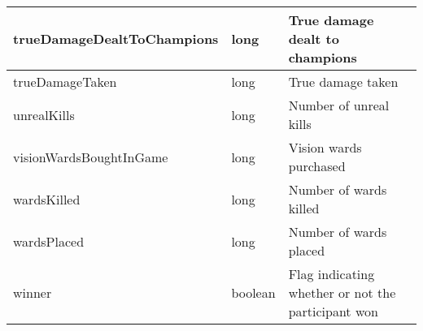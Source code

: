 \begin{table}[!h]
\begin{tabular}{llp{5cm}}
trueDamageDealtToChampions      & long               & True damage dealt to champions                                                  \\ \hline
trueDamageTaken                 & long               & True damage taken                                                               \\ \hline
unrealKills                     & long               & Number of unreal kills                                                          \\ \hline
visionWardsBoughtInGame         & long               & Vision wards purchased                                                          \\ \hline
wardsKilled                     & long               & Number of wards killed                                                          \\ \hline
wardsPlaced                     & long               & Number of wards placed                                                          \\ \hline
winner                          & boolean            & Flag indicating whether or not the participant won                              \\ \hline
\end{tabular}
\end{table}

\FloatBarrier
